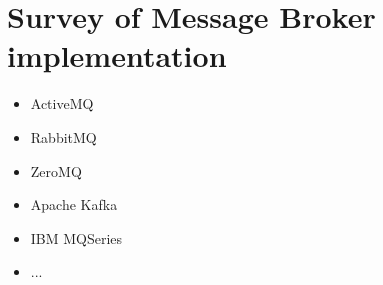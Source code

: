 \chapter{Survey of Message Broker implementation} 
\begin{itemize}
	\item ActiveMQ 
	\item RabbitMQ
	\item ZeroMQ
	\item Apache Kafka
	\item IBM MQSeries
	\item ... 
\end{itemize}


